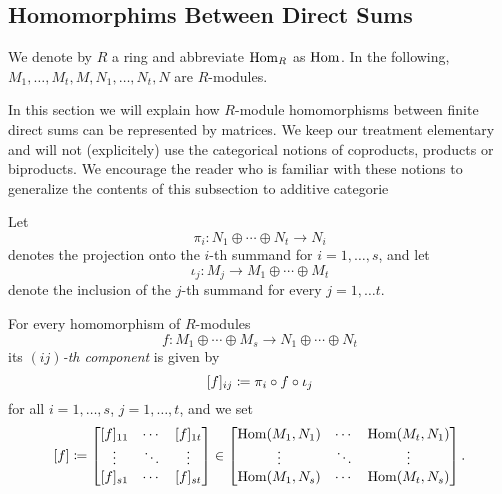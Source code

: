 \subsection{Homomorphims Between Direct Sums}
\label{appendix: homomorphisms between direct sums}


\begin{conventions}
  We denote by $R$ a ring and abbreviate $\operatorname{Hom}_R$ as $\operatorname{Hom}$.
  In the following, $M_1, \dotsc, M_t, M, N_1, \dotsc, N_t, N$ are $R$-modules.
\end{conventions}


\begin{fluff}
  In this section we will explain how $R$-module homomorphisms between finite direct sums can be represented  by matrices.
  We keep our treatment elementary and will not (explicitely) use the categorical notions of coproducts, products or biproducts.
  We encourage the reader who is familiar with these notions to generalize the contents of this subsection to additive categorie
\end{fluff}


\begin{fluff}
  Let
  \[
          \pi_i
  \colon  N_1 \oplus \dotsb \oplus N_t
  \to     N_i
  \]
  denotes the projection onto the $i$-th summand for $i = 1, \dotsc, s$, and let
  \[
            \iota_j
    \colon  M_j
    \to     M_1 \oplus \dotsb \oplus M_t
  \]
  denote the inclusion of the $j$-th summand for every $j = 1, \dotsc t$.
\end{fluff}


\begin{definition}
  For every homomorphism of $R$-modules
  \[
            f
    \colon  M_1 \oplus \dotsb \oplus M_s
    \to     N_1 \oplus \dotsb \oplus N_t
  \]
  its \emph{$(ij)$-th component} is given by
  \[
              [f]_{ij}
    \coloneqq  \pi_i \circ f \circ \iota_j
  \]
  for all $i = 1, \dotsc, s$, $j = 1, \dotsc, t$, and we set
  \[
              [f]
    \coloneqq  \begin{bmatrix}
                [f]_{11}  & \cdots  & [f]_{1t}  \\
                \vdots    & \ddots  & \vdots    \\
                [f]_{s1}  & \cdots  & [f]_{st}
              \end{bmatrix}
    \in       \begin{bmatrix}
                \operatorname{Hom}(M_1, N_1)  & \cdots  & \operatorname{Hom}(M_t, N_1)  \\
                \vdots          & \ddots  & \vdots          \\
                \operatorname{Hom}(M_1, N_s)  & \cdots  & \operatorname{Hom}(M_t, N_s)
              \end{bmatrix}.
  \]
\end{definition}


